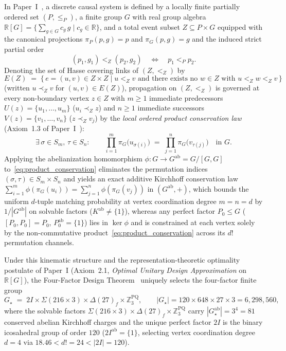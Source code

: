 \documentclass[11pt,a4paper]{article}
\theoremstyle{definition}
\theoremstyle{remark}
\newcommand{\R}{\mathbb{R}}
\newcommand{\Z}{\mathbb{Z}}
\newcommand{\Gstar}{G_\star}
\begin{document}
In Paper~I~\cite{PaperI}, a discrete causal system is defined by a locally finite partially ordered set $(P, \le_P)$, a finite group $G$ with real group algebra $\R[G] = \{\sum_{g \in G} c_g\,g \mid c_g \in \R\}$, and a total event subset $Z \subseteq P \times G$ equipped with the canonical projections $\pi_P(p, g) = p$ and $\pi_G(p, g) = g$ and the induced strict partial order
\begin{equation}
\label{eq:induced_order}
(p_1, g_1) <_Z (p_2, g_2) \quad\Longleftrightarrow\quad p_1 <_P p_2.
\end{equation}
Denoting the set of Hasse covering links of $(Z, <_Z)$ by
\begin{equation}
\label{eq:covering_links}
E(Z) \;=\; \bigl\{\, e = (u, v) \in Z \times Z \;\big|\; u <_Z v \text{ and there exists no } w \in Z \text{ with } u <_Z w <_Z v \,\bigr\}
\end{equation}
(written $u \prec_Z v$ for $(u, v) \in E(Z)$), propagation on $(Z, <_Z)$ is governed at every non-boundary vertex $z \in Z$ with $m \ge 1$ immediate predecessors $U(z) = \{u_1, \dots, u_m\}$ ($u_i \prec_Z z$) and $n \ge 1$ immediate successors $V(z) = \{v_1, \dots, v_n\}$ ($z \prec_Z v_j$) by the \emph{local ordered product conservation law} (Axiom~1.3 of Paper~I~\cite{PaperI}):
\begin{equation}
\label{eq:product_conservation}
\exists\, \sigma \in S_m,\, \tau \in S_n : \qquad \prod_{i=1}^m \pi_G\bigl(u_{\sigma(i)}\bigr) \;=\; \prod_{j=1}^n \pi_G\bigl(v_{\tau(j)}\bigr) \quad \text{in } G.
\end{equation}
Applying the abelianization homomorphism $\phi : G \to G^{\mathrm{ab}} = G/[G, G]$ to~\eqref{eq:product_conservation} eliminates the permutation indices $(\sigma, \tau) \in S_m \times S_n$ and yields an exact additive Kirchhoff conservation law $\sum_{i=1}^m \phi(\pi_G(u_i)) = \sum_{j=1}^n \phi(\pi_G(v_j))$ in $(G^{\mathrm{ab}}, +)$, which bounds the uniform $d$-tuple matching probability at vertex coordination degree $m = n = d$ by $1/|G^{\mathrm{ab}}|$ on solvable factors ($K^{\mathrm{ab}} \neq \{1\}$), whereas any perfect factor $P_0 \le G$ ($[P_0, P_0] = P_0$, $P_0^{\mathrm{ab}} = \{1\}$) lies in $\ker\phi$ and is constrained at each vertex solely by the non-commutative product~\eqref{eq:product_conservation} across its $d!$ permutation channels.

Under this kinematic structure and the representation-theoretic optimality postulate of Paper~I (Axiom~2.1, \emph{Optimal Unitary Design Approximation} on $\R[G]$), the Four-Factor Design Theorem~\cite{PaperI,PaperII} uniquely selects the four-factor finite group
\begin{equation}
\label{eq:gstar_product}
\Gstar \;=\; 2I \times \Sigma(216 \times 3) \times \Delta(27)_f \times \Z_3^{\mathrm{PQ}}, \qquad |\Gstar| = 120 \times 648 \times 27 \times 3 = 6{,}298{,}560,
\end{equation}
where the solvable factors $\Sigma(216 \times 3) \times \Delta(27)_f \times \Z_3^{\mathrm{PQ}}$ carry $|\Gstar^{\mathrm{ab}}| = 3^4 = 81$ conserved abelian Kirchhoff charges and the unique perfect factor $2I$ is the binary icosahedral group of order $120$ ($2I^{\mathrm{ab}} = \{1\}$, selecting vertex coordination degree $d = 4$ via $18.46 < d! = 24 < |2I| = 120$).
\end{document}
